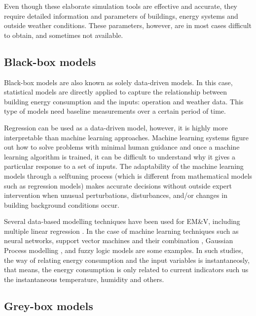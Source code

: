 \documentclass[10pt, conference, compsocconf]{IEEEtran}
\begin{document}
Even though these elaborate simulation tools are effective and accurate, they require detailed information and parameters of buildings, energy systems and outside weather conditions. These parameters, however, are in most cases difficult to obtain, and sometimes not available.

\subsection{Black-box models}


Black-box models are also known as solely data-driven models. In this case, statistical models are directly applied to capture the relationship between building energy consumption and the inputs: operation and weather data. This type of models need baseline measurements over a certain period of time.

Regression can be used as a data-driven model, however, it is highly more interpretable than machine learning approaches. 
Machine learning systems figure out how to solve problems with minimal human guidance and once a machine learning algorithm is trained, it can be difficult to understand why it gives a particular response to a set of inputs. The adaptability of the machine learning models through a selftuning process (which is different from mathematical models such as regression models) makes accurate decisions without outside expert intervention when unusual perturbations, disturbances, and/or changes in building background conditions occur.

Several data-based modelling techniques have been used for EM\&V, including multiple linear regression \cite{braun2014using}.  %
In the case of machine learning techniques such as neural networks, support vector machines and their combination \cite{ahmad2014review}, Gaussian Process modelling \cite{heo2012gaussian}, and fuzzy logic models \cite{ciabattoni2014fuzzy} are some examples. In such studies, the way of relating energy consumption and the input variables is instantaneosly, that means, the energy consumption is only related to current indicators such us the instantaneous temperature, humidity and others. 
  

\subsection{Grey-box models}
\end{document}

